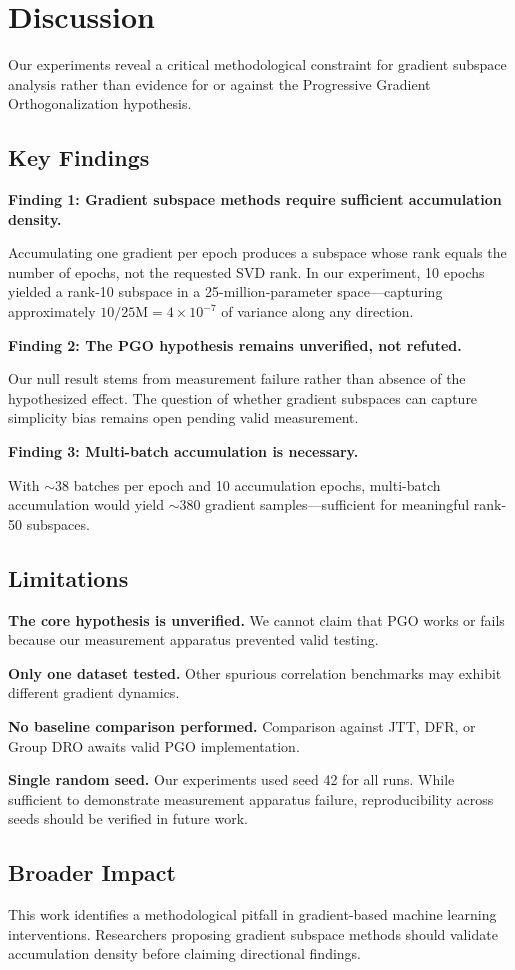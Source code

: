 \section{Discussion}

Our experiments reveal a critical methodological constraint for gradient subspace analysis rather than evidence for or against the Progressive Gradient Orthogonalization hypothesis.

\subsection{Key Findings}

\textbf{Finding 1: Gradient subspace methods require sufficient accumulation density.}

Accumulating one gradient per epoch produces a subspace whose rank equals the number of epochs, not the requested SVD rank. In our experiment, 10 epochs yielded a rank-10 subspace in a 25-million-parameter space---capturing approximately $10/25\text{M} = 4 \times 10^{-7}$ of variance along any direction.

\textbf{Finding 2: The PGO hypothesis remains unverified, not refuted.}

Our null result stems from measurement failure rather than absence of the hypothesized effect. The question of whether gradient subspaces can capture simplicity bias remains open pending valid measurement.

\textbf{Finding 3: Multi-batch accumulation is necessary.}

With $\sim$38 batches per epoch and 10 accumulation epochs, multi-batch accumulation would yield $\sim$380 gradient samples---sufficient for meaningful rank-50 subspaces.

\subsection{Limitations}

\textbf{The core hypothesis is unverified.} We cannot claim that PGO works or fails because our measurement apparatus prevented valid testing.

\textbf{Only one dataset tested.} Other spurious correlation benchmarks may exhibit different gradient dynamics.

\textbf{No baseline comparison performed.} Comparison against JTT, DFR, or Group DRO awaits valid PGO implementation.

\textbf{Single random seed.} Our experiments used seed 42 for all runs. While sufficient to demonstrate measurement apparatus failure, reproducibility across seeds should be verified in future work.

\subsection{Broader Impact}

This work identifies a methodological pitfall in gradient-based machine learning interventions. Researchers proposing gradient subspace methods should validate accumulation density before claiming directional findings.
